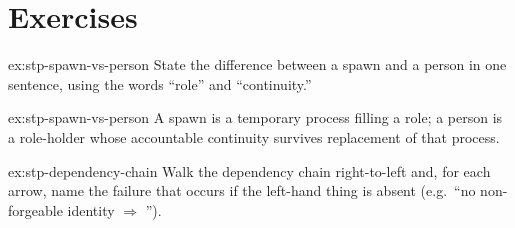 \documentclass[11pt,a4paper]{article}
\theoremstyle{definition}
\begin{document}
\section{Exercises}
\label{sec:stp-exercises}


\begin{pdexercise}[kind=Check,rating=1]{ex:stp-spawn-vs-person}
State the difference between a spawn and a person in one sentence, using the
words ``role'' and ``continuity.''
\end{pdexercise}
\begin{pdsolution}{ex:stp-spawn-vs-person}
A spawn is a temporary process filling a role; a person is a role-holder whose
accountable continuity survives replacement of that process.
\end{pdsolution}
\begin{pdexercise}[kind=Trace,rating=2]{ex:stp-dependency-chain}
Walk the dependency chain right-to-left and, for each arrow, name the failure
that occurs if the left-hand thing is absent (e.g.\ ``no non-forgeable
identity $\Rightarrow$ \underline{\hspace{3cm}}'').
\end{pdexercise}
\end{document}
